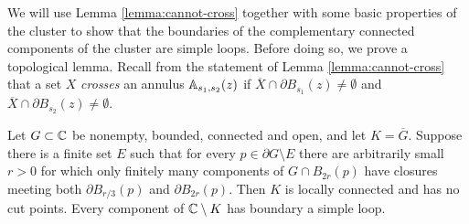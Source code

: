 \documentclass[12pt]{amsart}
\numberwithin{equation}{section}
\begin{document}
	
	We will use Lemma \ref{lemma:cannot-cross} together with some basic properties of the cluster to show
	that the boundaries of the complementary connected components of the cluster are simple loops. Before doing so, 
	we prove a topological lemma. Recall from the statement of Lemma \ref{lemma:cannot-cross} that a set $X$ {\it crosses} an annulus $\mathbb{A}_{s_1, s_2}(z)$ if 
	$\overline{X} \cap \partial B_{s_1}(z) \neq \emptyset$ and $\overline{X} \cap \partial B_{s_2}(z) \neq \emptyset$.
	\begin{lemma} \label{lemma:crossing-connected}
		Let $G\subset\mathbb{C}$ be nonempty, bounded, connected and open, and let $K=\overline G$. Suppose there is a finite set $E$
		such that for every $p\in\partial G\setminus E$ there are arbitrarily small $r>0$ for which only finitely many components
		of $G\cap B_{2r}(p)$ have closures meeting both $\partial B_{r/3}(p)$ and $\partial B_{2r}(p)$. Then $K$ is locally
		connected and has no cut points. Every component of $\mathbb{C}\setminus K$ has boundary a simple loop.
	\end{lemma}
\end{document}
